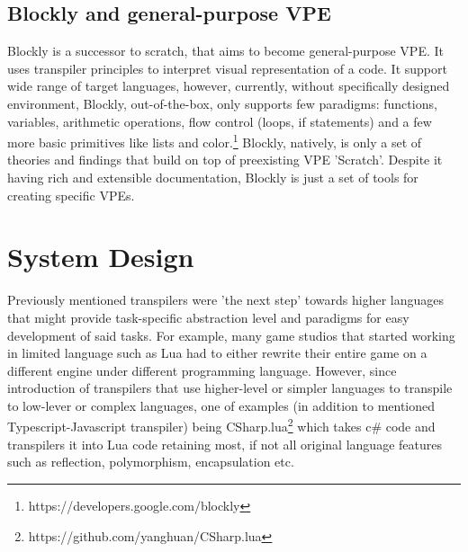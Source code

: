 \documentclass{article}
\begin{document}
\subsection{Blockly and general-purpose VPE}
Blockly is a successor to scratch, that aims to become general-purpose VPE. It uses transpiler principles to interpret visual representation of a code.\cite{7369000} It support wide range of target languages, however, currently, without specifically designed environment, Blockly, out-of-the-box, only supports few paradigms: functions, variables, arithmetic operations, flow control (loops, if statements) and a few more basic primitives like lists and color.\footnote{https://developers.google.com/blockly}
Blockly, natively, is only a set of theories and findings that build on top of preexisting VPE 'Scratch'.\cite{8120404} Despite it having rich and extensible documentation, Blockly is just a set of tools for creating specific VPEs.\cite{whitley_2006_evidence,bresson_2007_musical}

\section{System Design}
Previously mentioned transpilers were 'the next step' towards higher languages that might provide task-specific abstraction level and paradigms for easy development of said tasks.\cite{gribova_2013_ontology} For example, many game studios that started working in limited language such as Lua had to either rewrite their entire game on a different engine under different programming language. However, since introduction of transpilers that use higher-level or simpler languages to transpile to low-lever or complex languages, one of examples (in addition to mentioned Typescript-Javascript transpiler) being CSharp.lua\footnote{https://github.com/yanghuan/CSharp.lua} which takes c\# code and transpilers it into Lua code retaining most, if not all original language features such as reflection, polymorphism, encapsulation etc.
\end{document}
